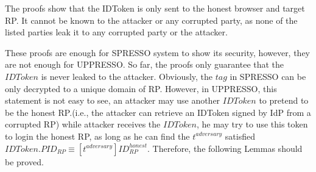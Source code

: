   The proofs show that the IDToken is only sent to the honest 
  browser and target RP. It cannot be known to the attacker or 
  any corrupted party, as none of the listed parties leak it to 
  any corrupted party or the attacker.
  
  These proofs are enough for SPRESSO system to show its 
  security, however, they are not enough for UPPRESSO. So far, 
  the proofs only guarantee that the $IDToken$ is never leaked 
  to the attacker. Obviously, the $tag$ in SPRESSO can be only 
  decrypted to a unique domain of RP. However, in UPPRESSO, this 
  statement is not easy to see, an attacker may use another 
  $IDToken$ to pretend to be the honest RP.(i.e., the attacker 
  can retrieve an IDToken signed by IdP from a corrupted RP)
  while attacker receives the $IDToken$, he may try to use this 
  token to login the honest RP, as long as he can find the 
  $t^{adversary}$ satisfied 
  $IDToken.PID_{RP} \equiv [t^{adversary}]ID_{RP}^{honest}$.
  Therefore, the following Lemmas should be proved.
  
